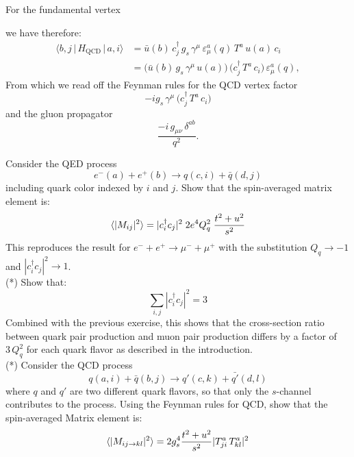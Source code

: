 \documentclass[12pt]{article}
\begin{document}
For the fundamental vertex
\begin{center}
\end{center}
we have therefore:
\begin{align*}
    \big\langle b, j \,\big|\, H_\text{QCD} \,\big|\, a, i \big\rangle
       &= \bar u(b)\, c_j^\dagger\, g_s\, \gamma^\mu\, \varepsilon^a_\mu(q)\, T^a\, u(a)\, c_i \\
       &= \big( \bar u(b)\, g_s\, \gamma^\mu\, u(a) \big)\,
          \big( c_j^\dagger\, T^a\, c_i \big)\,
          \varepsilon^a_\mu(q),
\end{align*}
From which we read off the Feynman rules for the QCD vertex factor
\begin{equation}
  -i g_s\, \gamma^\mu\, \big(c_j^\dagger\, T^a\, c_i\big)
\end{equation}
and the gluon propagator
\begin{equation}
  \frac{-i\, g_{\mu\nu}\, \delta^{ab}}{q^2}.
\end{equation}

\exercise Consider the QED process
$$e^-(a) + e^+(b) \to q(c,i) + \bar{q}(d,j)$$
including quark color indexed by $i$ and $j$.  Show that the
spin-averaged matrix element is:
$$\braket{|M_{ij}|^2} = |c_i^\dagger c_j|^2 \; 2e^4 Q^2_q
\; \frac{t^2+u^2}{s^2}$$
This reproduces the result for $e^- + e^+ \to \mu^- + \mu^+$
with the substitution $Q_q \to -1$ and $|c_i^\dagger c_j|^2 \to 1$.\\[5pt]

\exercise (*) Show that:
$$\sum_{i,j} |c_i^\dagger c_j|^2 = 3$$
Combined with the previous exercise, this shows that the cross-section
ratio between quark pair production and muon pair production differs
by a factor of $3\,Q_q^2$ for each quark flavor as described in the
introduction.\\[5pt]

\exercise (*) Consider the QCD process
$$q(a,i) + \bar{q}(b,j) \to q'(c,k) + \bar{q'}(d,l)$$ where $q$ and
$q'$ are two different quark flavors, so that only the $s$-channel
contributes to the process.  Using the Feynman rules for QCD, show
that the spin-averaged Matrix element is:
$$\braket{|M_{ij \to kl}|^2} = 2 g_s^4 \frac{t^2+u^2}{s^2}|T^a_{ji}\, T^a_{kl}|^2$$
\end{document}
